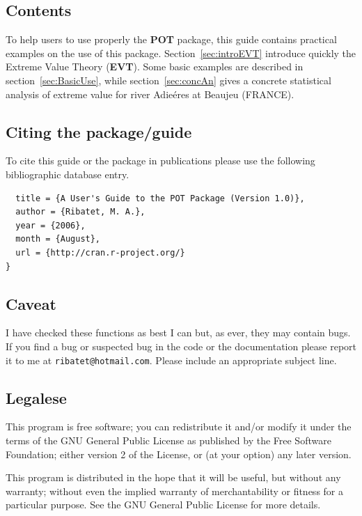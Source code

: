 \documentclass[a4paper]{article}
\numberwithin{equation}{section}
\theoremstyle{definition}
\begin{document}
\subsection{Contents}
\label{subsec:contents}

To help users to use properly the \textbf{POT} package, this guide
contains practical examples on the use of this
package. Section~\ref{sec:introEVT} introduce quickly the Extreme
Value Theory (\textbf{EVT}). Some basic examples are described in
section~\ref{sec:BasicUse}, while section~\ref{sec:concAn} gives a
concrete statistical analysis of extreme value for river Adie\'eres at
Beaujeu (FRANCE).

\subsection{Citing the package/guide}

To cite this guide or the package in publications please use the
following bibliographic database entry.
\begin{verbatim}
  title = {A User's Guide to the POT Package (Version 1.0)},
  author = {Ribatet, M. A.},
  year = {2006},
  month = {August},
  url = {http://cran.r-project.org/}
}
\end{verbatim}

\subsection{Caveat}

I have checked these functions as best I can but, as ever, they may
contain bugs.  If you find a bug or suspected bug in the code or the
documentation please report it to me at \verb+ribatet@hotmail.com+.
Please include an appropriate subject line.

\subsection{Legalese}

This program is free software; you can redistribute it and/or modify
it under the terms of the GNU General Public License as published by
the Free Software Foundation; either version 2 of the License, or (at
your option) any later version.

This program is distributed in the hope that it will be useful, but
without any warranty; without even the implied warranty of
merchantability or fitness for a particular purpose.  See the GNU
General Public License for more details.
\end{document}
